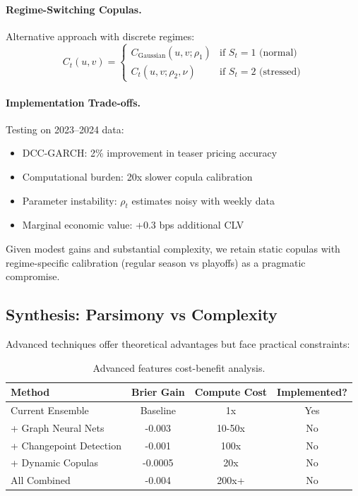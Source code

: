 \paragraph{Regime-Switching Copulas.}
Alternative approach with discrete regimes:
\begin{equation}
C_t(u,v) = \begin{cases}
C_{\text{Gaussian}}(u,v; \rho_1) & \text{if } S_t = 1 \text{ (normal)} \\
C_{t}(u,v; \rho_2, \nu) & \text{if } S_t = 2 \text{ (stressed)}
\end{cases}
\end{equation}

\paragraph{Implementation Trade-offs.}
Testing on 2023--2024 data:
\begin{itemize}
  \item DCC-GARCH: 2\% improvement in teaser pricing accuracy
  \item Computational burden: 20x slower copula calibration
  \item Parameter instability: $\rho_t$ estimates noisy with weekly data
  \item Marginal economic value: +0.3 bps additional CLV
\end{itemize}

Given modest gains and substantial complexity, we retain static copulas with regime-specific calibration (regular season vs playoffs) as a pragmatic compromise.

\subsection{Synthesis: Parsimony vs Complexity}

Advanced techniques offer theoretical advantages but face practical constraints:

\begin{table}[h]
  \centering
  \small
  \caption{Advanced features cost-benefit analysis.}
  \begin{tabular}{lccc}
    \toprule
    \textbf{Method} & \textbf{Brier Gain} & \textbf{Compute Cost} & \textbf{Implemented?} \\
    \midrule
    Current Ensemble & Baseline & 1x & Yes \\
    + Graph Neural Nets & -0.003 & 10-50x & No \\
    + Changepoint Detection & -0.001 & 100x & No \\
    + Dynamic Copulas & -0.0005 & 20x & No \\
    All Combined & -0.004 & 200x+ & No \\
    \bottomrule
  \end{tabular}
\end{table}

